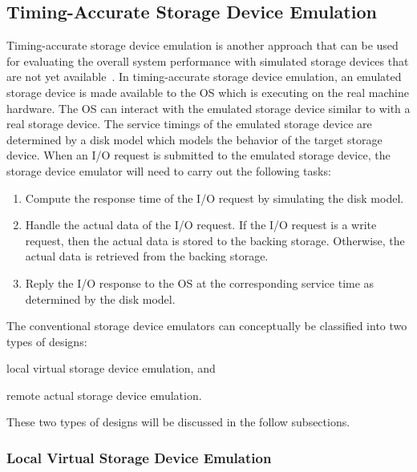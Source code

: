
\subsection{Timing-Accurate Storage Device Emulation}
\label{sec:ch2-timing-accurate}

Timing-accurate storage device emulation is another approach that can be used for evaluating the overall system performance with simulated storage devices that are not yet available~\cite{Griffin:2002}. In timing-accurate storage device emulation, an emulated storage device is made available to the OS which is executing on the real machine hardware. The OS can interact with the emulated storage device similar to with a real storage device. The service timings of the emulated storage device are determined by a disk model which models the behavior of the target storage device. When an I/O request is submitted to the emulated storage device, the storage device emulator will need to carry out the following tasks:

\begin{enumerate}
\item Compute the response time of the I/O request by simulating the disk model.
\item Handle the actual data of the I/O request. If the I/O request is a write request, then the actual data is stored to the backing storage. Otherwise, the actual data is retrieved from the backing storage.
\item	Reply the I/O response to the OS at the corresponding service time as determined by the disk model.
\end{enumerate}

The conventional storage device emulators can conceptually be classified into two types of designs:
\begin{enumerate*}[label=(\roman*)]
	\item local virtual storage device emulation, and
	\item remote actual storage device emulation.
\end{enumerate*}
These two types of designs will be discussed in the follow subsections.

\subsubsection{Local Virtual Storage Device Emulation}

